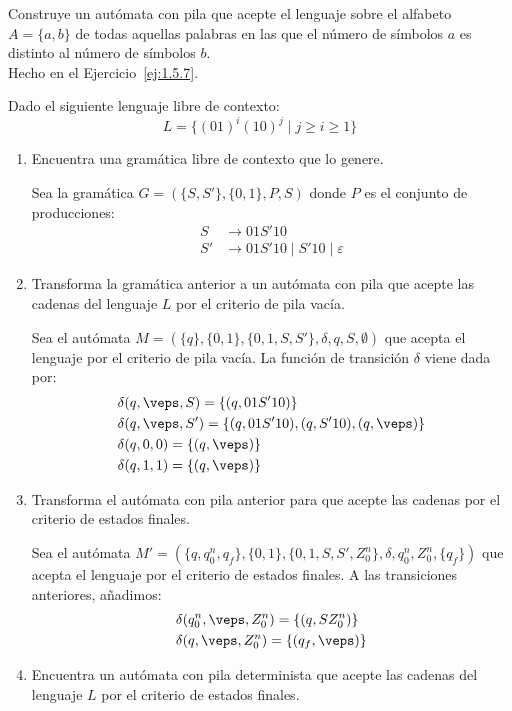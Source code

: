 \begin{ejercicio}\label{ej:1.5.27}
    Construye un autómata con pila que acepte el lenguaje sobre el alfabeto $A = \{a,b\}$ de todas aquellas palabras en las que el número de símbolos $a$ es distinto al número de símbolos $b$.\\

    Hecho en el Ejercicio~\ref{ej:1.5.7}.
\end{ejercicio}

\begin{ejercicio}\label{ej:1.5.28}
    Dado el siguiente lenguaje libre de contexto: $$L = \{{(01)}^{i}{(10)}^{j}\mid j\geq i \geq 1\}$$
    \begin{enumerate}
        \item Encuentra una gramática libre de contexto que lo genere.
        
        Sea la gramática $G = (\{S,S'\},\{0,1\},P,S)$ donde $P$ es el conjunto de producciones:
        \begin{align*}
            S & \rightarrow 01S'10\\
            S' & \rightarrow 01S'10 \mid S'10 \mid \varepsilon
        \end{align*}
        \item Transforma la gramática anterior a un autómata con pila que acepte las cadenas del lenguaje $L$ por el criterio de pila vacía.
        
        Sea el autómata $M = (\{q\},\{0,1\},\{0,1,S,S'\},\delta,q,S,\emptyset)$ que acepta el lenguaje por el criterio de pila vacía. La función de transición $\delta$ viene dada por:
        \begin{align*}
            &\delta(q,\veps, S) = \{(q,01S'10)\} \\
            &\delta(q,\veps, S') = \{(q,01S'10), (q,S'10), (q,\veps)\}\\
            &\delta(q,0,0) = \{(q,\veps)\} \\
            &\delta(q,1,1) = \{(q,\veps)\}
        \end{align*}
        \item Transforma el autómata con pila anterior para que acepte las cadenas por el criterio de estados finales.
        
        Sea el autómata $M' = (\{q, q_0^n, q_f\},\{0,1\},\{0,1,S,S', Z_0^n\},\delta,q_0^n,Z_0^n,\{q_f\})$ que acepta el lenguaje por el criterio de estados finales.
        A las transiciones anteriores, añadimos:
        \begin{align*}
            &\delta(q_0^n,\veps, Z_0^n) = \{(q,SZ_0^n)\} \\
            &\delta(q,\veps, Z_0^n) = \{(q_f,\veps)\}
        \end{align*}
        \item Encuentra un autómata con pila determinista que acepte las cadenas del lenguaje $L$ por el criterio de estados finales.
        

\end{enumerate}
\end{ejercicio}
